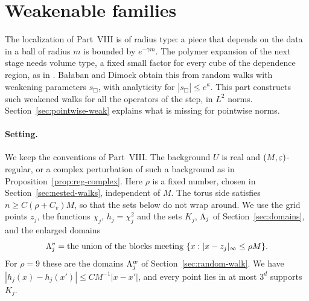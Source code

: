 \section{Weakenable families}\label{sec:weakenable}

The localization of Part~VIII is of radius type: a piece that depends on the data in a ball of radius $m$ is bounded by $e^{-\gamma m}$. The polymer expansion of the next stage needs volume type, a fixed small factor for every cube of the dependence region, as in \cite[(116)--(122)]{DimockI}. Ba\l aban and Dimock obtain this from random walks with weakening parameters $s_\Box$, with analyticity for $|s_\Box|\le e^{\kappa}$. This part constructs such weakened walks for all the operators of the step, in $L^2$ norms. Section~\ref{sec:pointwise-weak} explains what is missing for pointwise norms.

\paragraph{Setting.} We keep the conventions of Part~VIII. The background $U$ is real and $(M,\varepsilon)$-regular, or a complex perturbation of such a background as in Proposition~\ref{prop:reg-complex}. Here $\rho$ is a fixed number, chosen in Section~\ref{sec:nested-walks}, independent of $M$. The torus side satisfies $n\ge C(\rho+C_v)M$, so that the sets below do not wrap around. We use the grid points $z_j$, the functions $\chi_j$, $h_j=\chi_j^2$ and the sets $K_j$, $\Lambda_j$ of Section~\ref{sec:domains}, and the enlarged domains
\[
\Lambda^v_j=\text{the union of the blocks meeting }\{x:|x-z_j|_\infty\le\rho M\}.
\]
For $\rho=9$ these are the domains $\Lambda^w_j$ of Section~\ref{sec:random-walk}. We have $|h_j(x)-h_j(x')|\le CM^{-1}|x-x'|$, and every point lies in at most $3^d$ supports $K_j$.


